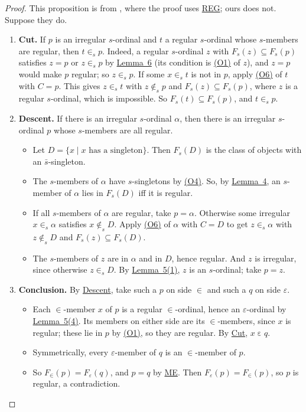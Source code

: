 \documentclass[11pt,a4paper]{article}
\theoremstyle{definition}
\theoremstyle{remark}
\newcommand{\eps}{\varepsilon}
\newcommand{\os}{\bar s}
\newcommand{\ME}{\textup{ME}}
\newcommand{\REG}{\textup{REG}}
\begin{document}
\begin{proof}
This proposition is from \cite[after Theorem~5.1]{H05}, where the proof uses {\hyperref[ax:REG]{\REG}}; ours does not. Suppose they do.
\begin{enumerate}[label=\arabic*.]
\item\label{step:cut} \textbf{Cut.} If $p$ is an irregular $s$-ordinal and $t$ a regular $s$-ordinal whose $s$-members are regular, then $t \in_s p$. Indeed, a regular $s$-ordinal $z$ with $F_s(z) \subseteq F_s(p)$ satisfies $z = p$ or $z \in_s p$ by {\hyperref[lem:6]{Lemma~6}} (its condition is {\hyperref[ord:O1]{(O1)}} of $z$), and $z = p$ would make $p$ regular; so $z \in_s p$. If some $x \in_s t$ is not in $p$, apply {\hyperref[ord:O6]{(O6)}} of $t$ with $C = p$. This gives $z \in_s t$ with $z \notin_s p$ and $F_s(z) \subseteq F_s(p)$, where $z$ is a regular $s$-ordinal, which is impossible. So $F_s(t) \subseteq F_s(p)$, and $t \in_s p$.
\item\label{step:descent} \textbf{Descent.} If there is an irregular $s$-ordinal $\alpha$, then there is an irregular $s$-ordinal $p$ whose $s$-members are all regular.
\begin{itemize}
\item Let $D = \{x \mid x \text{ has a singleton}\}$. Then $F_s(D)$ is the class of objects with an $\os$-singleton.
\item The $s$-members of $\alpha$ have $s$-singletons by {\hyperref[ord:O4]{(O4)}}. So, by {\hyperref[lem:4]{Lemma~4}}, an $s$-member of $\alpha$ lies in $F_s(D)$ iff it is regular.
\item If all $s$-members of $\alpha$ are regular, take $p = \alpha$. Otherwise some irregular $x \in_s \alpha$ satisfies $x \notin_s D$. Apply {\hyperref[ord:O6]{(O6)}} of $\alpha$ with $C = D$ to get $z \in_s \alpha$ with $z \notin_s D$ and $F_s(z) \subseteq F_s(D)$.
\item The $s$-members of $z$ are in $\alpha$ and in $D$, hence regular. And $z$ is irregular, since otherwise $z \in_s D$. By {\hyperref[lem:5a]{Lemma~5(1)}}, $z$ is an $s$-ordinal; take $p = z$.
\end{itemize}
\item \textbf{Conclusion.} By {\hyperref[step:descent]{Descent}}, take such a $p$ on side $\in$ and such a $q$ on side $\eps$.
\begin{itemize}
\item Each $\in$-member $x$ of $p$ is a regular $\in$-ordinal, hence an $\eps$-ordinal by {\hyperref[lem:5d]{Lemma~5(4)}}. Its members on either side are its $\in$-members, since $x$ is regular; these lie in $p$ by {\hyperref[ord:O1]{(O1)}}, so they are regular. By {\hyperref[step:cut]{Cut}}, $x \mathrel{\eps} q$.
\item Symmetrically, every $\eps$-member of $q$ is an $\in$-member of $p$.
\item So $F_{\in}(p) = F_{\eps}(q)$, and $p = q$ by {\hyperref[ax:ME]{\ME}}. Then $F_{\eps}(p) = F_{\in}(p)$, so $p$ is regular, a contradiction. \qedhere
\end{itemize}
\end{enumerate}
\end{proof}
\end{document}
